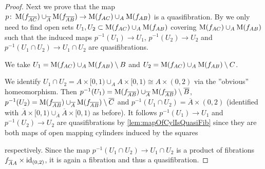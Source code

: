 \begin{prop}
\begin{proof}
        Next we prove that the map $p\colon\operatorname{M}(f_{\overline{A}\overline{C}})\cup_{\overline{A}}\operatorname{M}(f_{\overline{A}\overline{B}})\to\operatorname{M}(f_{AC})\cup_A\operatorname{M}(f_{AB})$ is a quasifibration.
        By %
        we only need to find open sets $U_1,U_2\subset\operatorname{M}(f_{AC})\cup_A\operatorname{M}(f_{AB})$ covering $\operatorname{M}(f_{AC})\cup_A\operatorname{M}(f_{AB})$ such that the induced maps $p^{-1}(U_1)\to U_1$, $p^{-1}(U_2)\to U_2$ and $p^{-1}(U_1\cap U_2)\to U_1\cap U_2$ are quasifibrations.

        We take $U_1=\operatorname{M}(f_{AC})\cup_A\operatorname{M}(f_{AB})\setminus{B}$ and $U_2=\operatorname{M}(f_{AC})\cup_A\operatorname{M}(f_{AB})\setminus{C}$. 

        We identify $U_1\cap U_2=A\times [0,1)\cup_A A\times[0,1)\cong A\times (0,2)$ via the ''obvious'' homeomorphism. %
        Then $p^{-1}(U_1)=\operatorname{M}(f_{\overline{A}\overline{B}})\cup_{\overline{A}}\operatorname{M}(f_{\overline{A}\overline{B}})\setminus{\overline{B}}$, $p^{-1}(U_2)=\operatorname{M}(f_{\overline{A}\overline{B}})\cup_{\overline{A}}\operatorname{M}(f_{\overline{A}\overline{B}})\setminus{\overline{C}}$ and $p^{-1}(U_1\cap U_2)=\overline{A}\times (0,2)$ (identified with $\overline{A}\times [0,1)\cup_{\overline{A}} \overline{A}\times[0,1)$ as before).
        It follows $p^{-1}(U_1)\to U_1$ and $p^{-1}(U_2)\to U_2$ are quasifibrations by \cref{lem:mapOfCylIsQuasiFib} since they are both maps of open mapping cylinders induced by the squares 
        \begin{center}
        \end{center}
        respectively.
        Since the map $p^{-1}(U_1\cap U_2)\to U_1\cap U_2$ is a product of fibrations $f_{\overline{A}A}\times\text{id}_{(0,2)}$, it is again a fibration and thus a quasifibration.


\end{proof}
\end{prop}
